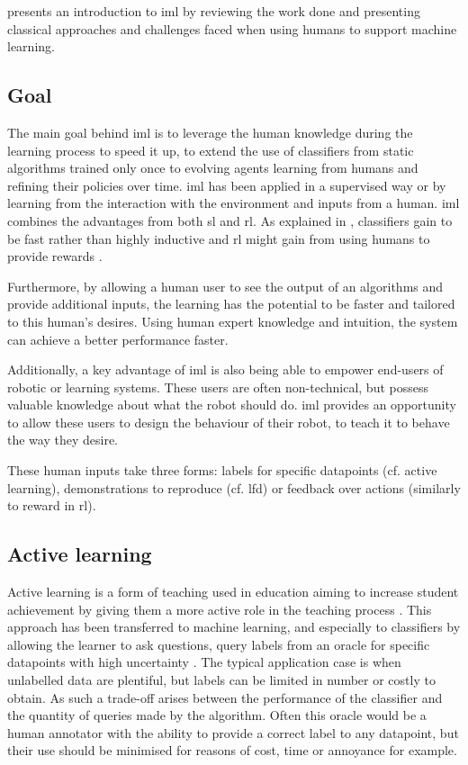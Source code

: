 \cite{amershi2014power} presents an introduction to \gls{iml} by reviewing the work done and presenting classical approaches and challenges faced when using humans to support machine learning.

\subsection{Goal}

The main goal behind \gls{iml} is to leverage the human knowledge during the learning process to speed it up, to extend the use of classifiers from static algorithms trained only once to evolving agents learning from humans and refining their policies over time. \gls{iml} has been applied in a supervised way or by learning from the interaction with the environment and inputs from a human. \gls{iml} combines the advantages from both \gls{sl} and \gls{rl}. As explained in \cite{fails2003interactive}, classifiers gain to be fast rather than highly inductive and \gls{rl} might gain from using humans to provide rewards \citep{knox2009interactively}.

Furthermore, by allowing a human user to see the output of an algorithms and provide additional inputs, the learning has the potential to be faster and tailored to this human's desires. Using human expert knowledge and intuition, the system can achieve a better performance faster.

Additionally, a key advantage of \gls{iml} is also being able to empower end-users of robotic or learning systems. These users are often non-technical, but possess valuable knowledge about what the robot should do. \gls{iml} provides an opportunity to allow these users to design the behaviour of their robot, to teach it to behave the way they desire.

These human inputs take three forms: labels for specific datapoints (cf. active learning), demonstrations to reproduce (cf. \gls{lfd}) or feedback over actions (similarly to reward in \gls{rl}).

\subsection{Active learning} \label{ssec:back_active}

Active learning is a form of teaching used in education aiming to increase student achievement by giving them a more active role in the teaching process \citep{johnson1991active}. This approach has been transferred to machine learning, and especially to classifiers by allowing the learner to ask questions, query labels from an oracle for specific datapoints with high uncertainty \citep{settles2012active}. The typical application case is when unlabelled data are plentiful, but labels can be limited in number or costly to obtain. As such a trade-off arises between the performance of the classifier and the quantity of queries made by the algorithm. Often this oracle would be a human annotator with the ability to provide a correct label to any datapoint, but their use should be minimised for reasons of cost, time or annoyance for example.

